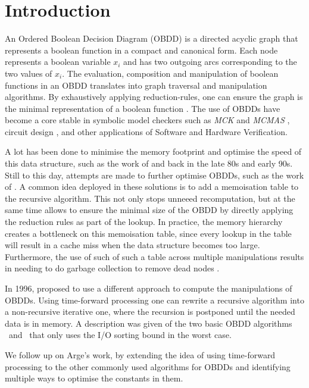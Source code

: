 \section{Introduction} \label{sec:intro}
An Ordered Boolean Decision Diagram (OBDD) is a directed acyclic graph that
represents a boolean function in a compact and canonical form. Each node
represents a boolean variable $x_i$ and has two outgoing arcs corresponding to
the two values of $x_i$. The evaluation, composition and manipulation of boolean
functions in an OBDD translates into graph traversal and manipulation
algorithms. By exhaustively applying reduction-rules, one can ensure the graph
is the minimal representation of a boolean function \cite{Bryant86}. The use of
OBDDs have become a core stable in symbolic model checkers such as \emph{MCK}
\cite{Gammie04} and \emph{MCMAS} \cite{Lomuscio17}, circuit design \todocite,
and other applications of Software and Hardware Verification.

A lot has been done to minimise the memory footprint and optimise the speed of
this data structure, such as the work of \textcite{Karplus88} and
\textcite{Brace90} back in the late 80s and early 90s. Still to this day,
attempts are made to further optimise OBDDs, such as the work of
\textcite{Dijk16}. A common idea deployed in these solutions is to add a
memoisation table to the recursive algorithm. This not only stops unneeed
recomputation, but at the same time allows to ensure the minimal size of the
OBDD by directly applying the reduction rules as part of the lookup. In
practice, the memory hierarchy creates a bottleneck on this memoisation table,
since every lookup in the table will result in a cache miss when the data
structure becomes too large. Furthermore, the use of such of such a table across
multiple manipulations results in needing to do garbage collection to remove dead
nodes \cite{Karplus88,Brace90,Dijk16}.

In 1996, \textcite{Arge96} proposed to use a different approach to compute the
manipulations of OBDDs. Using time-forward processing one can rewrite a
recursive algorithm into a non-recursive iterative one, where the recursion is
postponed until the needed data is in memory. A description was given of the two
basic OBDD algorithms \Reduce\ and \Apply\ that only uses the I/O sorting bound
in the worst case.

We follow up on Arge's work, by extending the idea of using time-forward
processing to the other commonly used algorithms for OBDDs and identifying
multiple ways to optimise the constants in them.

